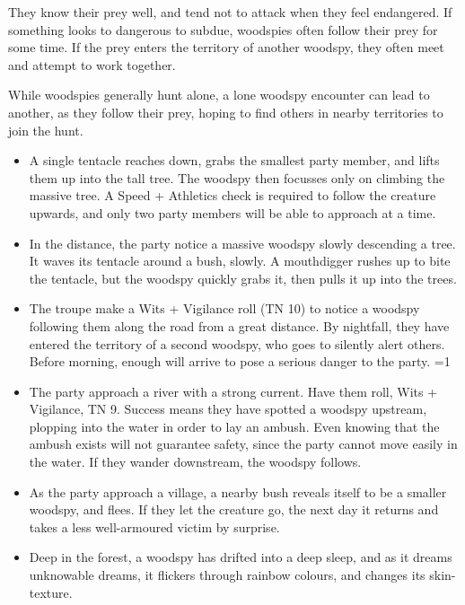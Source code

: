 \begin{multicols}{2}
They know their prey well, and tend not to attack when they feel endangered.
If something looks to dangerous to subdue, woodspies often follow their prey for some time.
If the prey enters the territory of another woodspy, they often meet and attempt to work together.

While woodspies generally hunt alone, a lone woodspy encounter can lead to another, as they follow their prey, hoping to find others in nearby territories to join the hunt.

\begin{itemize}

  \item
  A single tentacle reaches down, grabs the smallest party member, and lifts them up into the tall tree.
  The woodspy then focusses only on climbing the massive tree.
  A Speed + Athletics check is required to follow the creature upwards, and only two party members will be able to approach at a time.
  \item
  In the distance, the party notice a massive woodspy slowly descending a tree.
  It waves its tentacle around a bush, slowly.
  A mouthdigger rushes up to bite the tentacle, but the woodspy quickly grabs it, then pulls it up into the trees.
  \item
  The troupe make a Wits + Vigilance roll (TN 10) to notice a woodspy following them along the road from a great distance.
  By nightfall, they have entered the territory of a second woodspy, who goes to silently alert others.
  Before morning, enough will arrive to pose a serious danger to the party.
  \ifodd\value{temperature}=1
    \item
    The party approach a river with a strong current.
    Have them roll, Wits + Vigilance, TN 9.
    Success means they have spotted a woodspy upstream, plopping into the water in order to lay an ambush.
    Even knowing that the ambush exists will not guarantee safety, since the party cannot move easily in the water.
    If they wander downstream, the woodspy follows.
  \else
    \item
    As the party approach a village, a nearby bush reveals itself to be a smaller woodspy, and flees.
    If they let the creature go, the next day it returns and takes a less well-armoured victim by surprise.
    \item
    Deep in the forest, a woodspy has drifted into a deep sleep, and as it dreams unknowable dreams, it flickers through rainbow colours, and changes its skin-texture.
  \fi

\end{itemize}

\end{multicols}

